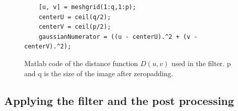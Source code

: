 \begin{figure}[h!]
  \begin{lstlisting}
    [u, v] = meshgrid(1:q,1:p);
    centerU = ceil(q/2);
    centerV = ceil(p/2);
    gaussianNumerator = ((u - centerU).^2 + (v - centerV).^2);
  \end{lstlisting}
  \label{code:raduv}
  \caption{Matlab code of the distance function $D(u,v)$ used in the filter. p and q is the size of the image after zeropadding.}
\end{figure}

\subsection{Applying the filter and the post processing}
